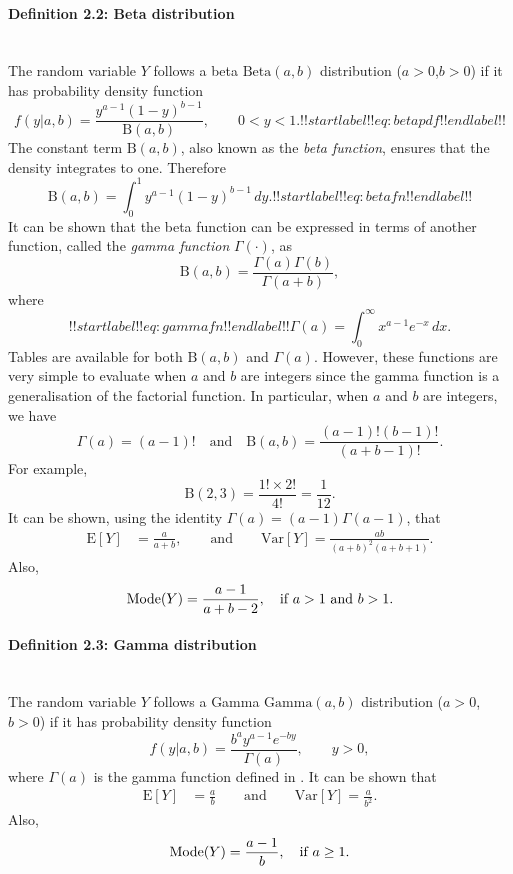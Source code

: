 \paragraph{Definition 2.2: Beta distribution}{~\\
\label{def:beta} The random variable $Y$ follows a beta $\mathrm{Beta}(a,b)$ distribution ($a>0$,$b>0$) if it has probability density function
\begin{equation}
f(y|a,b)=\frac{y^{a-1}(1-y)^{b-1}}{\mathrm{B}(a,b)},\quad\quad 0<y<1.
!!startlabel!! eq:betapdf !!endlabel!!
\end{equation}
The constant term $\mathrm{B}(a,b)$, also known as the {\it beta function},
ensures that the density integrates to one. Therefore
\begin{equation}
\mathrm{B}(a,b)=\int_0^1
y^{a-1}(1-y)^{b-1}\,dy.
!!startlabel!! eq:betafn !!endlabel!!
\end{equation}
It can be shown that the beta function can be expressed in terms of another function, called the {\it gamma function} $\Gamma(\cdot)$, as
$$
\mathrm{B}(a,b) =\frac{\Gamma(a)\Gamma(b)}{\Gamma(a+b)},
$$
where
\begin{equation}
!!startlabel!! eq:gammafn !!endlabel!!
\Gamma(a)=\int_0^\infty x^{a-1}e^{-x}\,dx.
\end{equation}
Tables are available for both $\mathrm{B}(a,b)$ and $\Gamma(a)$. However, these functions are very simple to evaluate when $a$ and $b$ are integers since the gamma function is a generalisation of the factorial function. In particular, when $a$ and $b$ are integers, we have
$$
\Gamma(a)=(a-1)!\quad\text{and}\quad 
\mathrm{B}(a,b)=\frac{(a-1)!(b-1)!}{(a+b-1)!}.
$$
For example,
\begin{equation*}
\mathrm{B}(2,3)=\frac{1!\times2!}{4!}=\frac{1}{12}.
\end{equation*}
It can be shown, using the identity $\Gamma(a)=(a-1)\Gamma(a-1)$, that
\begin{align*}
\text{E}[Y]&=\frac{a}{a+b},\quad\quad\text{and}\quad\quad 
\text{Var}[Y]=\frac{ab}{(a+b)^2(a+b+1)}. 
\end{align*}
Also,
$$\textnormal{Mode}(Y)=\frac{a-1}{a+b-2}, \quad\text{if $a>1$ and $b>1$}.$$}
\clearpage
\paragraph{Definition 2.3: Gamma distribution}{~\\
  The random variable $Y$ follows a Gamma $\mathrm{Gamma}(a,b)$ distribution
  ($a>0$, $b>0$) if it has probability density function
$$f(y|a,b) =\frac{b^ay^{a-1}e^{-by}}{\Gamma(a)},\quad\quad y>0,$$ where $\Gamma(a)$ is the gamma function defined in
. It can be shown that
\begin{align*}
\text{E}[Y]&=\frac{a}{b}\quad\quad\text{and}\quad\quad 
\text{Var}[Y]=\frac{a}{b^2}. 
\end{align*}
Also,
$$\textnormal{Mode}(Y)=\frac{a-1}{b}, \quad\text{if $a\geq 1$}.
$$}

